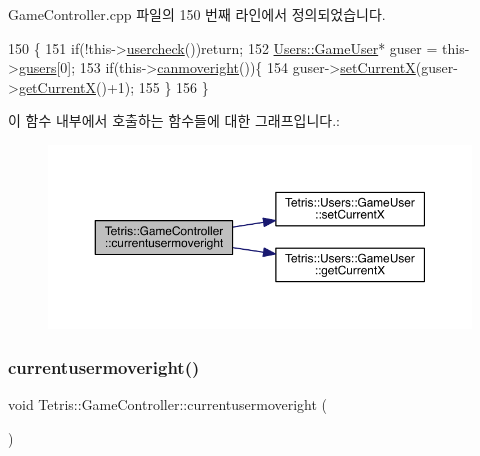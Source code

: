 Game\+Controller.\+cpp 파일의 150 번째 라인에서 정의되었습니다.


\begin{DoxyCode}
150                                              \{
151                 \textcolor{keywordflow}{if}(!this->\hyperlink{class_tetris_1_1_game_controller_ab96e22daad51119b35cbee8cfb7385ef}{usercheck}())\textcolor{keywordflow}{return};
152                 \hyperlink{class_tetris_1_1_users_1_1_game_user}{Users::GameUser}* guser = this->\hyperlink{class_tetris_1_1_game_controller_a1a31d3a933daad6d95e20458eea2900e}{gusers}[0];
153                 \textcolor{keywordflow}{if}(this->\hyperlink{class_tetris_1_1_game_controller_a6c8189bb893502049396a7de1a73a88c}{canmoveright}())\{
154                     guser->\hyperlink{class_tetris_1_1_users_1_1_game_user_a2957358b1a6298f06c6c2e10cb89f623}{setCurrentX}(guser->\hyperlink{class_tetris_1_1_users_1_1_game_user_ad25eace96bd27ae6df4a0c0d506be730}{getCurrentX}()+1);
155                 \}
156             \}
\end{DoxyCode}
이 함수 내부에서 호출하는 함수들에 대한 그래프입니다.\+:
\nopagebreak
\begin{figure}[H]
\begin{center}
\leavevmode
\includegraphics[width=350pt]{db/dd2/class_tetris_1_1_game_controller_a1d2859507cbc9bf9789753228cdedc1f_cgraph}
\end{center}
\end{figure}
\mbox{\label{class_tetris_1_1_game_controller_a1d2859507cbc9bf9789753228cdedc1f}} 
\subsubsection{\texorpdfstring{currentusermoveright()}{currentusermoveright()}\hspace{0.1cm}{\footnotesize\ttfamily [2/2]}}
{\footnotesize\ttfamily void Tetris\+::\+Game\+Controller\+::currentusermoveright (\begin{DoxyParamCaption}{ }\end{DoxyParamCaption})\hspace{0.3cm}{\ttfamily [inline]}}



